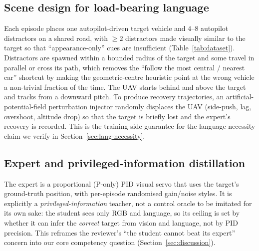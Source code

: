 \documentclass[11pt]{article}
\begin{document}
\subsection{Scene design for load-bearing language}
\label{sec:benchmark-design}
Each episode places one autopilot-driven target vehicle and $4$--$8$
autopilot distractors on a shared road, with $\geq 2$ distractors made
visually similar to the target so that ``appearance-only'' cues are
insufficient (Table~\ref{tab:dataset}). Distractors are spawned within a
bounded radius of the target and some travel in parallel or cross its path,
which removes the ``follow the most central / nearest car'' shortcut by
making the geometric-centre heuristic point at the wrong vehicle a
non-trivial fraction of the time. The UAV starts behind and above the target
and tracks from a downward pitch. To produce recovery trajectories, an
artificial-potential-field perturbation injector randomly displaces the UAV
(side-push, lag, overshoot, altitude drop) so that the target is briefly
lost and the expert's recovery is recorded. This is the training-side
guarantee for the language-necessity claim we verify in
Section~\ref{sec:lang-necessity}.

\subsection{Expert and privileged-information distillation}
\label{sec:benchmark-expert}
The expert is a proportional (P-only) PID visual servo that uses the
target's ground-truth position, with per-episode randomised gain/noise
styles. It is explicitly a \emph{privileged-information} teacher, not a
control oracle to be imitated for its own sake: the student sees only RGB
and language, so its ceiling is set by whether it can infer the
\emph{correct} target from vision and language, not by PID precision. This
reframes the reviewer's ``the student cannot beat its expert'' concern into
our core competency question (Section~\ref{sec:discussion}).
\end{document}
